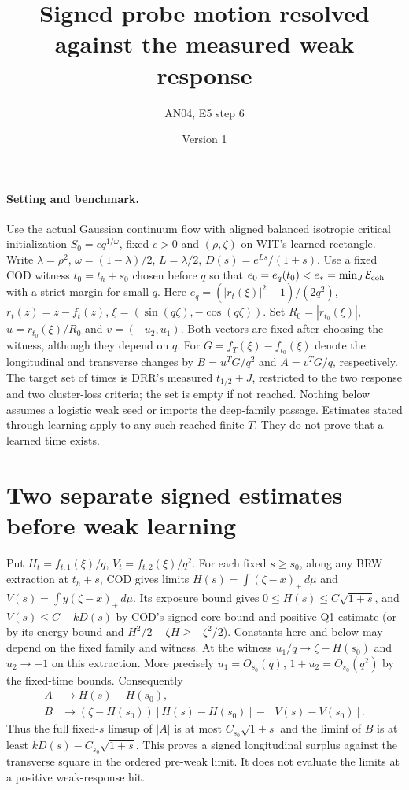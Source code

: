 \documentclass[11pt]{article}
\title{Signed probe motion resolved against the measured weak response}
\author{AN04, E5 step 6}\date{Version 1}
\newcommand{\dd}{\,d}\newcommand{\E}{\mathbb E}
\begin{document}
\maketitle

\paragraph{Setting and benchmark.}
Use the actual Gaussian continuum flow with aligned balanced isotropic
critical initialization $S_0=cq^{1/\omega}$, fixed $c>0$ and
$(\rho,\zeta)$ on WIT's learned rectangle. Write $\lambda=\rho^2$,
$\omega=(1-\lambda)/2$, $L=\lambda/2$, $D(s)=e^{Ls}/(1+s)$.
Use a fixed COD witness $t_0=t_h+s_0$ chosen before $q$ so that
$e_0=e_q(t_0)<e_*=\min_J\mathcal E_{\rm coh}$ with a strict margin
for small $q$. Here $e_q=(|r_t(\xi)|^2-1)/(2q^2)$,
$r_t(z)=z-f_t(z)$, $\xi=(\sin(q\zeta),-\cos(q\zeta))$.
Set $R_0=|r_{t_0}(\xi)|$, $u=r_{t_0}(\xi)/R_0$ and
$v=(-u_2,u_1)$. Both vectors are fixed after choosing the witness,
although they depend on $q$.
For $G=f_T(\xi)-f_{t_0}(\xi)$ denote the longitudinal and transverse
changes by $B=u^TG/q^2$ and $A=v^TG/q$, respectively. The target
set of times is DRR's measured $t_{1/2}+J$, restricted to the two
response and two cluster-loss criteria; the set is empty if not
reached. Nothing below assumes a logistic weak seed or imports the
deep-family passage. Estimates stated through learning apply to any
such reached finite $T$. They do not prove that a learned time exists.

\section{Two separate signed estimates before weak learning}
\label{an04spmv1:early}
Put $H_t=f_{t,1}(\xi)/q$, $V_t=f_{t,2}(\xi)/q^2$.
For each fixed $s\ge s_0$, along any BRW extraction at $t_h+s$,
COD gives limits $H(s)=\int(\zeta-x)_+\dd\mu$ and
$V(s)=\int y(\zeta-x)_+\dd\mu$. Its exposure bound gives
$0\le H(s)\le C\sqrt{1+s}$, and
$V(s)\le C-kD(s)$ by COD's signed core bound and positive-Q1 estimate
(or by its energy bound and $H^2/2-\zeta H\ge-\zeta^2/2$).
Constants here and below may depend on the fixed family and witness.
At the witness $u_1/q\to\zeta-H(s_0)$ and $u_2\to-1$ on this
extraction. More precisely $u_1=O_{s_0}(q)$, $1+u_2=O_{s_0}(q^2)$
by the fixed-time bounds. Consequently
\begin{align*}
 A&\longrightarrow H(s)-H(s_0),\\
 B&\longrightarrow (\zeta-H(s_0))[H(s)-H(s_0)]-[V(s)-V(s_0)] .
\end{align*}
Thus the full fixed-$s$ limsup of $|A|$ is at most $C_{s_0}\sqrt{1+s}$
and the liminf of $B$ is at least $kD(s)-C_{s_0}\sqrt{1+s}$.
This proves a signed longitudinal surplus against the transverse
square in the ordered pre-weak limit. It does not evaluate the
limits at a positive weak-response hit.
\end{document}
